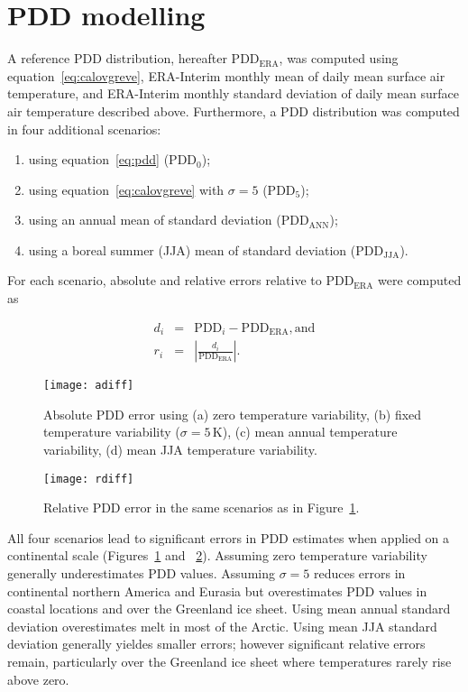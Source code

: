 \documentclass[review]{igs}
\begin{document}

\section{PDD modelling}

A reference PDD distribution, hereafter $\mathrm{PDD_{ERA}}$, was computed using equation~\ref{eq:calovgreve}, ERA-Interim monthly mean of daily mean surface air temperature, and ERA-Interim monthly standard deviation of daily mean surface air temperature described above. Furthermore, a PDD distribution was computed in four additional scenarios:

\begin{enumerate}
  \item using equation~\ref{eq:pdd} ($\mathrm{PDD_{0}}$);
  \item using equation~\ref{eq:calovgreve} with $\sigma=5$ ($\mathrm{PDD_{5}}$);
  \item using an annual mean of standard deviation ($\mathrm{PDD_{ANN}}$);
  \item using a boreal summer (JJA) mean of standard deviation ($\mathrm{PDD_{JJA}}$).
\end{enumerate}

For each scenario, absolute and relative errors relative to $\mathrm{PDD_{ERA}}$ were computed as

\begin{eqnarray}
  d_i &=& \mathrm{PDD}_i - \mathrm{PDD_{ERA}}, \mathrm{and}\\
  r_i &=& \left|\frac{d_i}{\mathrm{PDD_{ERA}}}\right|.
\end{eqnarray}

\begin{figure}
  \centering\texttt{[image: adiff]}
  \caption{Absolute PDD error using (a) zero temperature variability, (b) fixed temperature variability ($\sigma=5\,\mathrm{K}$), (c) mean annual temperature variability, (d) mean JJA temperature variability.}
  \label{fig:adiff}
\end{figure}

\begin{figure}
  \centering\texttt{[image: rdiff]}
  \caption{Relative PDD error in the same scenarios as in Figure~\ref{fig:adiff}.}
  \label{fig:rdiff}
\end{figure}

All four scenarios lead to significant errors in PDD estimates when applied on a continental scale (Figures~\ref{fig:adiff} and ~\ref{fig:rdiff}). Assuming zero temperature variability generally underestimates PDD values. Assuming $\sigma=5$ reduces errors in continental northern America and Eurasia but overestimates PDD values in coastal locations and over the Greenland ice sheet. Using mean annual standard deviation overestimates melt in most of the Arctic. Using mean JJA standard deviation generally yieldes smaller errors; however significant relative errors remain, particularly over the Greenland ice sheet where temperatures rarely rise above zero.
\end{document}
